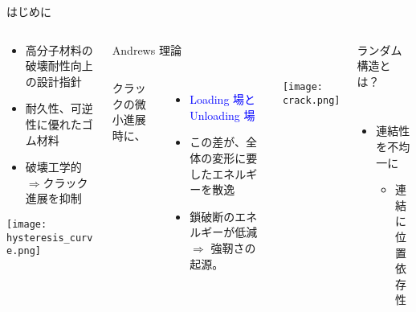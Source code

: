 \begin{frame}[t]{}
		
		\vspace{10mm}
		

		\begin{block}{はじめに}
			\begin{columns}[T]
				\begin{column}{.33\linewidth}
					\begin{itemize}
						\item 高分子材料の破壊耐性向上の設計指針
						\item 耐久性、可逆性に優れたゴム材料
						\item 破壊工学的$\Rightarrow$クラック進展を抑制
					\end{itemize}
					\centering
					\texttt{[image: hysteresis\_curve.png]} 
				\end{column}
				\begin{column}{.33\linewidth}
					\begin{itembox}[l]{Andrews 理論\cite{andrews}}
						\begin{columns}[totalwidth=.9\textwidth]
								クラックの微小進展時に、
								\begin{itemize}
								\item
								\textcolor{blue}{Loading 場とUnloading 場}
								\item
								\alert{この差}が、全体の変形に要したエネルギーを\alert{散逸}
								\item
								鎖破断のエネルギーが低減 \\$\Rightarrow$ \alert{強靭さの起源。}
								\end{itemize}	
								\texttt{[image: crack.png]}     
						\end{columns}
					\end{itembox}
				\end{column}
				\begin{column}{.33\linewidth}
					\begin{itembox}[l]{ランダム構造とは？}
						\begin{columns}[totalwidth=.9\textwidth]
									\begin{itemize}
										\item 連結性を不均一に
											\begin{itemize}
												\item 連結に\alert{位置依存性}
											\end{itemize}

\end{itemize}
\end{columns}
\end{itembox}
\end{column}
\end{columns}
\end{block}
\end{frame}
